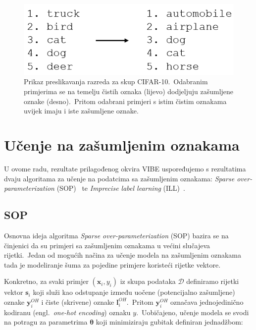 \documentclass[diplomskirad]{fer}
\begin{document}
\begin{figure}[h]
  \centering
  \includegraphics[scale=0.7]{./Slike/asym.png}
  \caption{Prikaz preslikavanja razreda za skup CIFAR-10.\ Odabranim primjerima se na temelju čistih oznaka (lijevo) dodjeljuju zašumljene oznake (desno).\ Pritom odabrani primjeri s istim čistim oznakama uvijek imaju i iste zašumljene oznake.}
  \label{fig:asym}
\end{figure}

\pagebreak

\section{Učenje na zašumljenim oznakama}
\label{sek:ucenje_na_zasumljenim}

U ovome radu, rezultate prilagođenog okvira VIBE uspoređujemo s rezultatima dvaju algoritama za učenje na podatcima sa zašumljenim oznakama: \textit{Sparse over-parameterization} (SOP)~\cite{liu2022robust} te \textit{Imprecise label learning} (ILL)~\cite{chen2024imprecise}.\ 

\subsection{SOP}
\label{sub:sop}

Osnovna ideja algoritma \textit{Sparse over-parameterization} (SOP) bazira se na činjenici da su primjeri sa zašumljenim oznakama u većini slučajeva rijetki.\ 
Jedan od mogućih načina za učenje modela na zašumljenim oznakama tada je modeliranje šuma za pojedine primjere koristeći rijetke vektore.\ 

Konkretno, za svaki primjer $(\bm{x}_i, y_i)$ iz skupa podataka $\mathcal{D}$ definiramo rijetki vektor $\bm{s}_i$ koji služi kao odstupanje između uočene (potencijalno zašumljene) oznake $\bm{y}_i^{OH}$ i čiste (skrivene) oznake $\bm{l}_i^{OH}$.\ 
Pritom $\bm{y}_i^{OH}$ označava jednojedinično kodiranu (engl.\ \textit{one-hot encoding}) oznaku $y$.\ Uobičajeno, učenje modela se svodi na potragu za parametrima $\bm{\theta}$ koji minimiziraju gubitak definiran jednadžbom:
\end{document}

